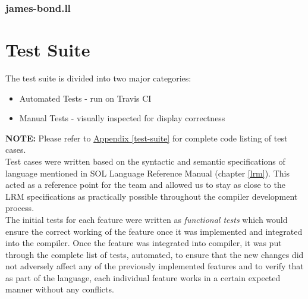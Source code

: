 \documentclass[letterpaper,12pt]{report}
\begin{document}
    \subsubsection{james-bond.ll}
        

  \section{Test Suite}
    The test suite is divided into two major categories:
    \begin{itemize}
      \itemsep 0em
      \item Automated Tests - run on Travis CI
      \item Manual Tests - visually inspected for display correctness
    \end{itemize}

    \textbf{NOTE:} Please refer to \underline{Appendix \ref{test-suite}} for complete code listing of test cases.\\

    Test cases were written based on the syntactic and semantic specifications of language mentioned in SOL Language Reference Manual (chapter \ref{lrm}). This acted as a reference point for the team and allowed us to stay as close to the LRM specifications as practically possible throughout the compiler development process.\\

    The initial tests for each feature were written as \textit{functional tests} which would ensure the correct working of the feature once it was implemented and integrated into the compiler. Once the feature was integrated into compiler, it was put through the complete list of tests, automated, to ensure that the new changes did not adversely affect any of the previously implemented features and to verify that as part of the language, each individual feature works in a certain expected manner without any conflicts.\\
\end{document}
